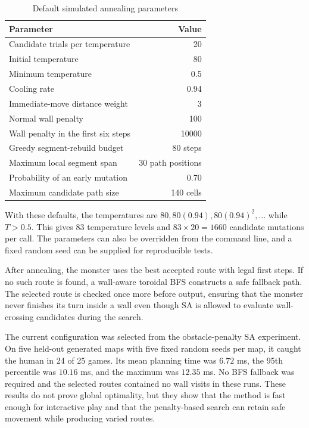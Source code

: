 \begin{table}[H]
\centering
\caption{Default simulated annealing parameters}
\begin{tabular}{lr}
\toprule
Parameter & Value \\
\midrule
Candidate trials per temperature & 20 \\
Initial temperature & 80 \\
Minimum temperature & 0.5 \\
Cooling rate & 0.94 \\
Immediate-move distance weight & 3 \\
Normal wall penalty & 100 \\
Wall penalty in the first six steps & 10000 \\
Greedy segment-rebuild budget & 80 steps \\
Maximum local segment span & 30 path positions \\
Probability of an early mutation & 0.70 \\
Maximum candidate path size & 140 cells \\
\bottomrule
\end{tabular}
\end{table}

With these defaults, the temperatures are $80,80(0.94),80(0.94)^2,\ldots$
while $T>0.5$. This gives 83 temperature levels and $83\times20=1660$
candidate mutations per call. The parameters can also be overridden from the
command line, and a fixed random seed can be supplied for reproducible tests.

After annealing, the monster uses the best accepted route with legal first
steps. If no such route is found, a wall-aware toroidal BFS constructs a safe
fallback path. The selected route is checked once more before output, ensuring
that the monster never finishes its turn inside a wall even though SA is
allowed to evaluate wall-crossing candidates during the search.

The current configuration was selected from the obstacle-penalty SA experiment.
On five held-out generated maps with five fixed random seeds per map, it caught
the human in 24 of 25 games. Its mean planning time was $6.72$ ms, the 95th
percentile was $10.16$ ms, and the maximum was $12.35$ ms. No BFS fallback
was required and the selected routes contained no wall visits in these runs.
These results do not prove global optimality, but they show that the method is
fast enough for interactive play and that the penalty-based search can retain
safe movement while producing varied routes.
